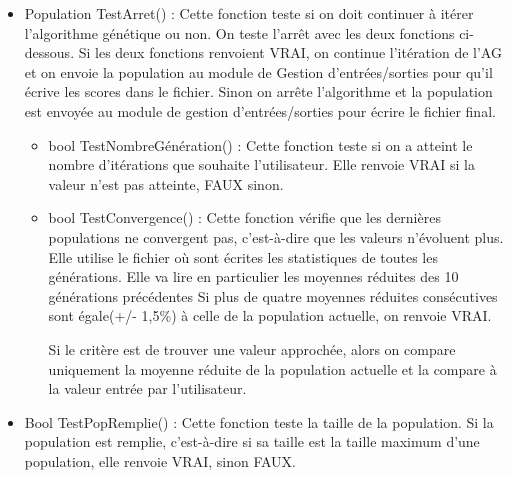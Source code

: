 \documentclass[a4paper,11pt]{article}
\begin{document}
				\begin{itemize}
							\item Population TestArret() :  Cette fonction teste si on doit continuer à itérer l’algorithme génétique ou non. 
								On teste l’arrêt avec les deux fonctions ci-dessous. 
								Si les deux fonctions renvoient VRAI, on continue l’itération de l’AG et on envoie la population au module de Gestion d’entrées/sorties pour qu’il écrive les scores dans le fichier. 
								Sinon on arrête l'algorithme et la population est envoyée au module de gestion d’entrées/sorties pour écrire le fichier final.\vspace{0.2cm}
								\begin{itemize}
								\item bool TestNombreGénération() : Cette fonction teste si on a atteint le nombre d’itérations que souhaite l’utilisateur.
									Elle renvoie VRAI si la valeur n’est pas atteinte, FAUX sinon.\vspace{0.2cm}
								\item bool TestConvergence() : Cette fonction vérifie que les dernières populations ne convergent pas, c'est-à-dire que les valeurs n'évoluent plus. %
								Elle utilise le fichier où sont écrites les statistiques de toutes les générations. Elle va lire en particulier les moyennes réduites des 10 générations précédentes
															Si plus de quatre moyennes réduites consécutives sont égale(+/- 1,5$\%$) à celle de la population actuelle, on renvoie VRAI.

															Si le critère est de trouver une valeur approchée, alors on compare uniquement la moyenne réduite de la population actuelle et la compare à la valeur entrée par l'utilisateur.\vspace{0.2cm}
								\end{itemize}
							
							\item Bool TestPopRemplie() : Cette fonction teste la taille de la population. Si la population est remplie, c’est-à-dire si sa taille est la taille maximum d’une population, elle renvoie VRAI, sinon FAUX.\vspace{0.2cm}
					
					\end{itemize}
				
\end{document}
